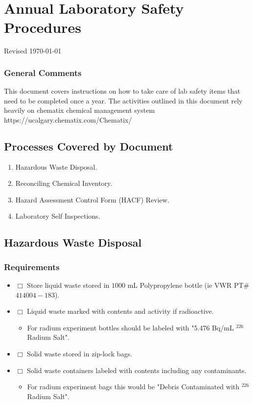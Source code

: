 \documentclass[justified]{tufte-book}
\begin{document}
\def\Item{\item[$\Box$]}
\pagestyle{fullpage}

\chapter{Annual Laboratory Safety Procedures}\label{chp:ciLabInspections}
\vspace{-1cm}
\noindent Revised \today %

\subsection{\bf General Comments}
This document covers instructions on how to take care of lab safety items that need to be completed once a year. The activities outlined in this document rely heavily on chematix chemical management system https://ucalgary.chematix.com/Chematix/

\section{\bf Processes Covered by Document}
\begin{enumerate}
	\item Hazardous Waste Disposal.
	\item Reconciling Chemical Inventory.
	\item Hazard Assessment Control Form (HACF) Review.
	\item Laboratory Self Inspections.
\end{enumerate}

\section{\bf Hazardous Waste Disposal}
\subsection{Requirements}
\begin{itemize}
	\Item Store liquid waste stored in $1000$ mL Polypropylene bottle (ie VWR PT\# 				$414004-183$). 
	\Item Liquid waste marked with contents and activity if radioactive.
	\begin{itemize}
		\item For radium experiment bottles should be labeled with "5.476 Bq/mL $^{226}				$Radium 	Salt".
	\end{itemize}
	\Item Solid waste stored in zip-lock bags.
	\Item Solid waste containers labeled with contents including any contaminants.
	\begin{itemize}
		\item For radium experiment bags this would be "Debris Contaminated with $^{226}				$Radium	Salt".
	\end{itemize}
\end{itemize}
\end{document}
